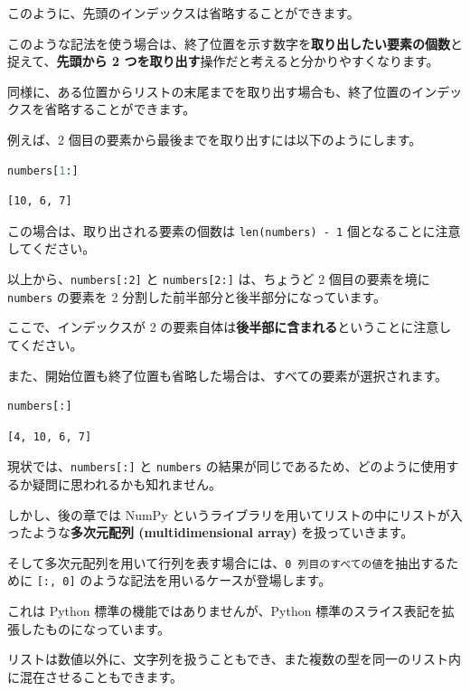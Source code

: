 このように、先頭のインデックスは省略することができます。

このような記法を使う場合は、終了位置を示す数字を\textbf{取り出したい要素の個数}と捉えて、\textbf{先頭から 2 つを取り出す}操作だと考えると分かりやすくなります。


同様に、ある位置からリストの末尾までを取り出す場合も、終了位置のインデックスを省略することができます。

例えば、2 個目の要素から最後までを取り出すには以下のようにします。


\begin{lstlisting}[style=codecell,language=Python]
numbers[1:]
\end{lstlisting}

\begin{lstlisting}[style=outputcell]
[10, 6, 7]
\end{lstlisting}

この場合は、取り出される要素の個数は \texttt{len(numbers) - 1} 個となることに注意してください。


以上から、\texttt{numbers[:2]} と \texttt{numbers[2:]} は、ちょうど 2 個目の要素を境に \texttt{numbers} の要素を 2 分割した前半部分と後半部分になっています。

ここで、インデックスが 2 の要素自体は\textbf{後半部に含まれる}ということに注意してください。


また、開始位置も終了位置も省略した場合は、すべての要素が選択されます。


\begin{lstlisting}[style=codecell,language=Python]
numbers[:]
\end{lstlisting}

\begin{lstlisting}[style=outputcell]
[4, 10, 6, 7]
\end{lstlisting}

現状では、\texttt{numbers[:]} と \texttt{numbers} の結果が同じであるため、どのように使用するか疑問に思われるかも知れません。

しかし、後の章では NumPy というライブラリを用いてリストの中にリストが入ったような\textbf{多次元配列 (multidimensional array)} を扱っていきます。

そして多次元配列を用いて行列を表す場合には、\texttt{0 列目のすべての値}を抽出するために \texttt{[:, 0]} のような記法を用いるケースが登場します。

これは Python 標準の機能ではありませんが、Python 標準のスライス表記を拡張したものになっています。


リストは数値以外に、文字列を扱うこともでき、また複数の型を同一のリスト内に混在させることもできます。


